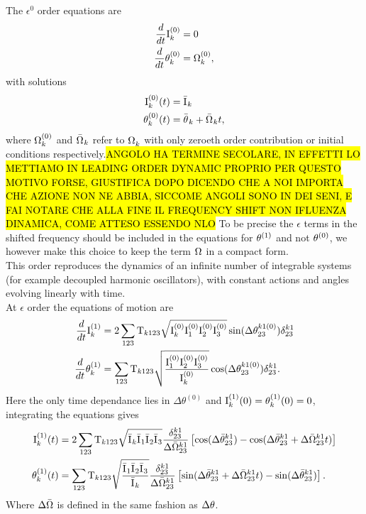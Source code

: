 The $\epsilon^0$ order equations are
\begin{align}
    \frac{d}{dt}\mathrm{I}^{(0)}_k &= 0   \\
    \frac{d}{dt}\theta^{(0)}_k &= \Omega^{(0)}_k, 
\end{align}
with solutions 
\begin{align}
    \mathrm{I}^{(0)}_k(t) &= \bar{\mathrm{I}^{}}_k \label{solzero1}\\
    \theta^{(0)}_k(t) &= \bar{\theta^{}}_k + \bar{\Omega^{}}_kt, \label{solzero2}
\end{align}
where $\Omega^{(0)}_k$ and $\bar{\Omega^{}}_k$ refer to $\Omega^{}_k$ with only zeroeth order contribution or initial conditions respectively.\hl{ANGOLO HA TERMINE SECOLARE, 
    IN EFFETTI LO METTIAMO IN LEADING ORDER DYNAMIC PROPRIO PER QUESTO MOTIVO FORSE, 
GIUSTIFICA DOPO DICENDO CHE A NOI IMPORTA CHE AZIONE NON NE ABBIA, SICCOME ANGOLI SONO IN DEI SENI, 
E FAI NOTARE CHE ALLA FINE IL FREQUENCY SHIFT NON IFLUENZA DINAMICA, COME ATTESO ESSENDO NLO}
To be precise the $\epsilon$ terms in 
the shifted frequency should be included in the equations for $\theta^{(1)}$ and not $\theta^{(0)}$, we however make this choice to keep the term $\Omega^{}$ in a compact form.\\
This order reproduces the dynamics of an infinite number of integrable systems (for example decoupled harmonic oscillators), with constant actions and angles evolving linearly with time. \\

At $\epsilon$ order the equations of motion are 
\begin{align}
    \frac{d}{dt}\mathrm{I}^{(1)}_k &= 2\sum_{123} \mathrm{T}_{k123} \sqrt{\mathrm{I}^{(0)}_k\mathrm{I}^{(0)}_1\mathrm{I}^{(0)}_2\mathrm{I}^{(0)}_3} \sin(\Delta\theta^{k1(0)}_{23})\delta^{k1}_{23}\\
    \frac{d}{dt}\theta^{(1)}_k &= \sum_{123} \mathrm{T}_{k123} \sqrt{\frac{\mathrm{I}^{(0)}_1\mathrm{I}^{(0)}_2\mathrm{I}^{(0)}_3}{\mathrm{I}^{(0)}_k}}\cos(\Delta\theta^{k1(0)}_{23})\delta^{k1}_{23}.
\end{align}
Here the only time dependance lies in $\Delta\theta^{(0)}$ and $\mathrm{I}^{(1)}_k(0) = \theta^{(1)}_k(0) = 0$, integrating the equations gives
\begin{align}
    \mathrm{I}^{(1)}_k(t) &= 2\sum_{123} \mathrm{T}_{k123} \sqrt{\bar{\mathrm{I}^{}}_k\bar{\mathrm{I}^{}}_1\bar{\mathrm{I}^{}}_2\bar{\mathrm{I}^{}}_3} \frac{\delta^{k1}_{23}}{\Delta\bar{\Omega}^{k1}_{23}}
    \left[ \cos(\Delta\bar{\theta}^{k1}_{23}) - \cos(\Delta\bar{\theta}^{k1}_{23} + \Delta\bar{\Omega}^{k1}_{23}t) \right] \label{solone1}\\
    \theta^{(1)}_k(t) &= \sum_{123} \mathrm{T}_{k123} \sqrt{\frac{\bar{\mathrm{I}^{}}_1\bar{\mathrm{I}^{}}_2\bar{\mathrm{I}^{}}_3}{\bar{\mathrm{I}^{}}_k}} \frac{\delta^{k1}_{23}}{\Delta\bar{\Omega}^{k1}_{23}}
    \left[ \sin(\Delta\bar{\theta}^{k1}_{23} + \Delta\bar{\Omega}^{k1}_{23}t) -\sin(\Delta\bar{\theta}^{k1}_{23}) \right]. \label{solone2}
\end{align}
Where $\Delta\bar{\Omega}$ is defined in the same fashion as $\Delta\theta$. \\


